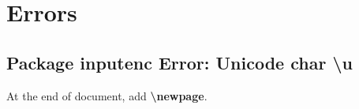 
\chapter{Errors}
\section{Package inputenc Error: Unicode char \textbackslash u}
At the end of document, add \textbf{\textbackslash newpage}.